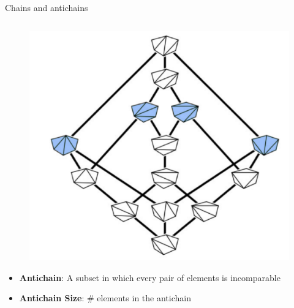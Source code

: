 \documentclass[xcolor=x11names,compress,t]{beamer}
\begin{document}
\begin{frame}{Chains and antichains}
\begin{columns}
        \begin{column}{0.5\textwidth}
            \begin{figure}
                \centering
                \includegraphics[scale = 0.08]{Antichain_B.PNG}
            \end{figure}
            
            \begin{itemize}
                \item \textbf{Antichain}: A subset in which every pair of elements is incomparable
                
                \item \textbf{Antichain Size}: \# elements in the antichain
            \end{itemize}
        \end{column}
        
    \end{columns}
\end{frame}

    
\end{document}
